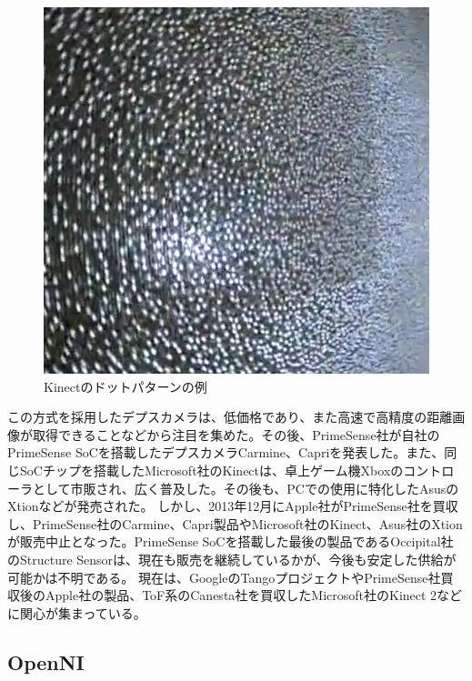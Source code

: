 \begin{figure}[ht]
  \centering
  \includegraphics[width=\columnwidth]{pictures/chapter8/pic_08_15.png}
  \caption{Kinectのドットパターンの例}
\end{figure}


この方式を採用したデプスカメラは、低価格であり、また高速で高精度の距離画像が取得できることなどから注目を集めた。その後、PrimeSense社が自社のPrimeSense SoCを搭載したデプスカメラCarmine、Capriを発表した。また、同じSoCチップを搭載したMicrosoft社のKinectは、卓上ゲーム機Xboxのコントローラとして市販され、広く普及した。その後も、PCでの使用に特化したAsusのXtionなどが発売された。
しかし、2013年12月にApple社がPrimeSense社を買収し、PrimeSense社のCarmine、Capri製品やMicrosoft社のKinect、Asus社のXtionが販売中止となった。PrimeSense SoCを搭載した最後の製品であるOccipital社のStructure Sensorは、現在も販売を継続しているかが、今後も安定した供給が可能かは不明である。
現在は、GoogleのTangoプロジェクトやPrimeSense社買収後のApple社の製品、ToF系のCanesta社を買収したMicrosoft社のKinect 2などに関心が集まっている。

\subsection{OpenNI}

